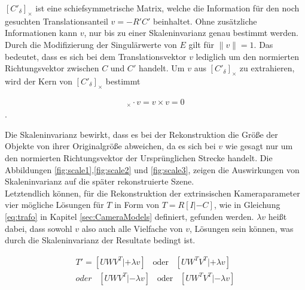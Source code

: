 
$[C'_\delta]_\times$ ist eine schiefsymmetrische Matrix, welche die Information für den noch gesuchten Translationsanteil $v = -R'C'$ beinhaltet. Ohne zusätzliche Informationen kann $v$, nur bis zu einer Skaleninvarianz genau bestimmt werden\cite{HZ,Ferid,phdextrinsicPara}. Durch die Modifizierung der Singulärwerte von $E$ gilt für $\parallel v \parallel = 1$\cite{HZ,Ferid}. Das bedeutet, dass es sich bei dem Translationsvektor $v$ lediglich um den normierten Richtungsvektor zwischen $C$ und $C'$ handelt\cite{KIT}. Um $v$ aus $[C'_\delta]_\times$ zu extrahieren, wird der Kern von $[C'_\delta]_\times$ bestimmt


\begin{gather}
[C'_\delta]_\times \cdot v = v \times v = 0
\end{gather} 
.

Die Skaleninvarianz bewirkt, dass es bei der Rekonstruktion die Größe der Objekte von ihrer Originalgröße abweichen, da es sich bei $v$ wie gesagt nur um den normierten Richtungsvektor der Ursprünglichen Strecke handelt. Die Abbildungen \ref{fig:scale1},\ref{fig:scale2} und \ref{fig:scale3}, zeigen die Auswirkungen von Skaleninvarianz auf die später rekonstruierte Szene. \\

Letztendlich können, für die Rekonstruktion der extrinsischen Kameraparameter vier mögliche Lösungen für $T$ in Form von $T = R[I|-C]$, wie in Gleichung \ref{eq:trafo} in Kapitel \ref{sec:CameraModels} definiert, gefunden werden\cite{HZ,Ferid,phdextrinsicPara}. $\lambda v$ heißt dabei, dass sowohl $v$ also auch alle Vielfache von $v$, Lösungen sein können, was durch die Skaleninvarianz der Resultate bedingt ist\cite{HZ,Ferid,phdextrinsicPara}. 

\begin{gather}
T' = [UWV^T|+\lambda v] \;\;\; \text{oder} \;\;\;[UW^TV^T|+\lambda v]\\
\textit{oder}\;\;\; [UWV^T|-\lambda v] \;\;\; \text{oder} \;\;\;[UW^TV^T|-\lambda v]
\end{gather}

